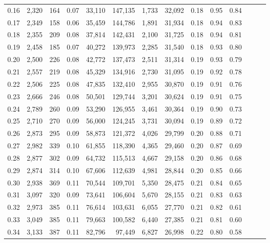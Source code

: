 \begin{tabular}{rrrrrrrrrrrrrr}
0.16 &  2,320 &    164 &  0.07 &   33,110 &  147,135 &   1,733 &  32,092 &  0.18 &  0.95 &      0.84 \\
0.17 &  2,349 &    158 &  0.06 &   35,459 &  144,786 &   1,891 &  31,934 &  0.18 &  0.94 &      0.83 \\
0.18 &  2,355 &    209 &  0.08 &   37,814 &  142,431 &   2,100 &  31,725 &  0.18 &  0.94 &      0.81 \\
0.19 &  2,458 &    185 &  0.07 &   40,272 &  139,973 &   2,285 &  31,540 &  0.18 &  0.93 &      0.80 \\
0.20 &  2,500 &    226 &  0.08 &   42,772 &  137,473 &   2,511 &  31,314 &  0.19 &  0.93 &      0.79 \\
0.21 &  2,557 &    219 &  0.08 &   45,329 &  134,916 &   2,730 &  31,095 &  0.19 &  0.92 &      0.78 \\
0.22 &  2,506 &    225 &  0.08 &   47,835 &  132,410 &   2,955 &  30,870 &  0.19 &  0.91 &      0.76 \\
0.23 &  2,666 &    246 &  0.08 &   50,501 &  129,744 &   3,201 &  30,624 &  0.19 &  0.91 &      0.75 \\
0.24 &  2,789 &    260 &  0.09 &   53,290 &  126,955 &   3,461 &  30,364 &  0.19 &  0.90 &      0.73 \\
0.25 &  2,710 &    270 &  0.09 &   56,000 &  124,245 &   3,731 &  30,094 &  0.19 &  0.89 &      0.72 \\
0.26 &  2,873 &    295 &  0.09 &   58,873 &  121,372 &   4,026 &  29,799 &  0.20 &  0.88 &      0.71 \\
0.27 &  2,982 &    339 &  0.10 &   61,855 &  118,390 &   4,365 &  29,460 &  0.20 &  0.87 &      0.69 \\
0.28 &  2,877 &    302 &  0.09 &   64,732 &  115,513 &   4,667 &  29,158 &  0.20 &  0.86 &      0.68 \\
0.29 &  2,874 &    314 &  0.10 &   67,606 &  112,639 &   4,981 &  28,844 &  0.20 &  0.85 &      0.66 \\
0.30 &  2,938 &    369 &  0.11 &   70,544 &  109,701 &   5,350 &  28,475 &  0.21 &  0.84 &      0.65 \\
0.31 &  3,097 &    320 &  0.09 &   73,641 &  106,604 &   5,670 &  28,155 &  0.21 &  0.83 &      0.63 \\
0.32 &  2,973 &    385 &  0.11 &   76,614 &  103,631 &   6,055 &  27,770 &  0.21 &  0.82 &      0.61 \\
0.33 &  3,049 &    385 &  0.11 &   79,663 &  100,582 &   6,440 &  27,385 &  0.21 &  0.81 &      0.60 \\
0.34 &  3,133 &    387 &  0.11 &   82,796 &   97,449 &   6,827 &  26,998 &  0.22 &  0.80 &      0.58 \\

\end{tabular}

